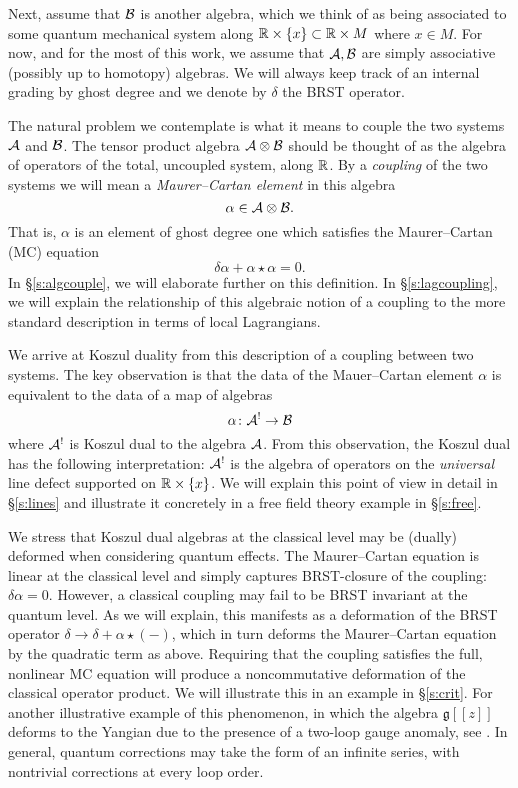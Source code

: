 \documentclass[11pt]{amsart}
\begin{document}
Next, assume that $\mathcal B$ is another algebra, which we think of as being associated to some quantum mechanical system along $\mathbb R \times \{x\} \subset \mathbb R \times M$ where $x \in M$. 
For now, and for the most of this work, we assume that $\mathcal A,\mathcal B$ are simply associative (possibly up to homotopy) algebras. 
We will always keep track of an internal grading by ghost degree and we denote by $\delta$ the BRST operator. 

The natural problem we contemplate is what it means to couple the two systems $\mathcal A$ and $\mathcal B$. 
The tensor product algebra $\mathcal A \otimes \mathcal B$ should be thought of as the algebra of operators of the total, uncoupled system, along $\mathbb R$. 
By a {\em coupling} of the two systems we will mean a {\em Maurer--Cartan element} in this algebra
\[
\alpha \in \mathcal A \otimes \mathcal B .
\]
That is, $\alpha$ is an element of ghost degree one which satisfies the Maurer--Cartan (MC) equation
\[
\delta \alpha + \alpha \star \alpha = 0 .
\]
In \S \ref{s:algcouple}, we will elaborate further on this definition. 
In \S \ref{s:lagcoupling}, we will explain the relationship of this algebraic notion of a coupling to the more standard description in terms of local Lagrangians.

We arrive at Koszul duality from this description of a coupling between two systems. 
The key observation is that the data of the Mauer--Cartan element $\alpha$ is equivalent to the data of a map of algebras
\[
\alpha \colon \mathcal A^! \to \mathcal B 
\]
where $\mathcal A^!$ is Koszul dual to the algebra $\mathcal A$. 
From this observation, the Koszul dual has the following interpretation: $\mathcal A^!$ is the algebra of operators on the {\em universal} line defect supported on $\mathbb R \times \{x\}$. We will explain this point of view in detail in \S \ref{s:lines} and illustrate it concretely in a free field theory example in \S \ref{s:free}. 

We stress that Koszul dual algebras at the classical level may be (dually) deformed when considering quantum effects. The Maurer--Cartan equation is linear at the classical level and simply captures BRST-closure of the coupling: $\delta \alpha = 0$. However, a classical coupling may fail to be BRST invariant at the quantum level. As we will explain, this manifests as a deformation of the BRST operator $\delta \rightarrow \delta + \alpha \star (-)$, which in turn deforms the Maurer--Cartan equation by the quadratic term as above. Requiring that the coupling satisfies the full, nonlinear MC equation will produce a noncommutative deformation of the classical operator product. We will illustrate this in an example in \S \ref{s:crit}. For another illustrative example of this phenomenon, in which the algebra $\mathfrak{g}[[z]]$ deforms to the Yangian due to the presence of a two-loop gauge anomaly, see \cite{CWY}. In general, quantum corrections may take the form of an infinite series, with nontrivial corrections at every loop order. 
\end{document}
